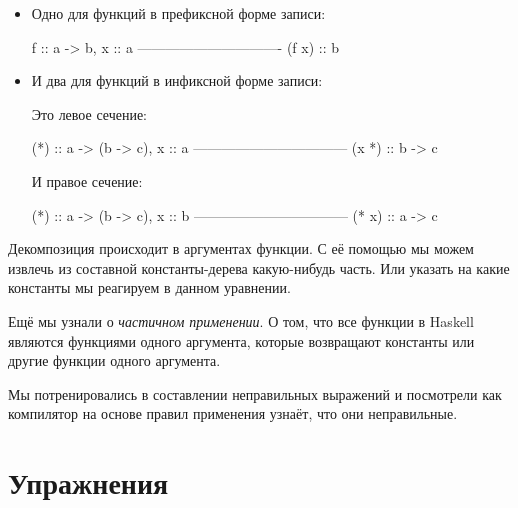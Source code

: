 \begin{itemize}

\item Одно для функций в префиксной форме записи:

\begin{code}
                    f :: a -> b,           x :: a 
                    -------------------------------
                              (f x) :: b
\end{code}

\item И два для функций в инфиксной форме записи:

Это левое сечение:

\begin{code}
                    (*) :: a -> (b -> c),     x :: a 
                    ---------------------------------
                             (x *) :: b -> c
\end{code}

И правое сечение:

\begin{code}
                    (*) :: a -> (b -> c),     x :: b 
                    ---------------------------------
                                (* x) :: a -> c
\end{code}

\end{itemize}


Декомпозиция происходит в аргументах функции. 
С её помощью мы можем извлечь из составной константы-дерева
какую-нибудь часть. Или указать на какие константы мы реагируем 
в данном уравнении. 

Ещё мы узнали о \emph{частичном применении}. О том, что все
функции в Haskell являются функциями одного аргумента,
которые возвращают константы или другие функции одного аргумента. 

Мы потренировались в составлении неправильных выражений
и посмотрели как компилятор на основе правил применения 
узнаёт, что они неправильные.

\section{Упражнения}


